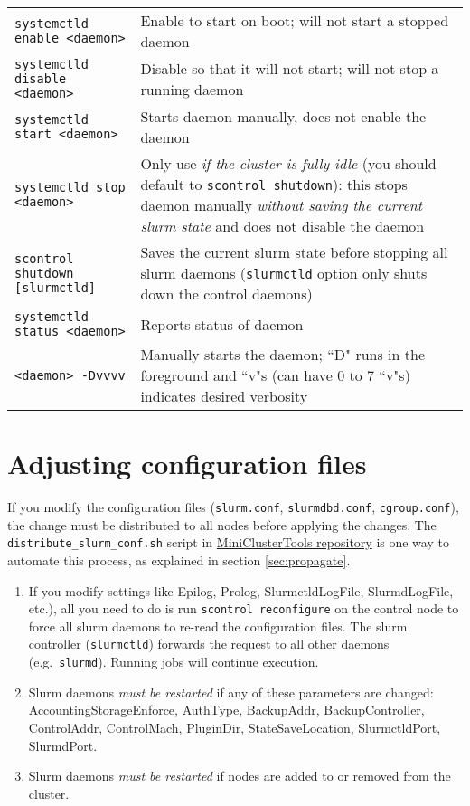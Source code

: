\begin{itemize}
\begin{tabular}{l p{3.8in}}
  \texttt{systemctld enable <daemon>}  & Enable to start on boot; will not start a stopped daemon \\
  \texttt{systemctld disable <daemon>} & Disable so that it will not start; will not stop a running daemon \\
  \texttt{systemctld start <daemon>}   & Starts daemon manually, does not enable the daemon \\
  \texttt{systemctld stop <daemon>}    & Only use \emph{if the cluster is fully idle} (you should default to \texttt{scontrol shutdown}): this stops daemon manually \emph{without saving the current slurm state} and does not disable the daemon \\
  \texttt{scontrol shutdown [slurmctld]} & Saves the current slurm state before stopping all slurm daemons (\texttt{slurmctld} option only shuts down the control daemons) \\
  \texttt{systemctld status <daemon>}  & Reports status of daemon \\
  \texttt{<daemon> -Dvvvv}             & Manually starts the daemon; ``D" runs in the foreground and ``v"s (can have 0 to 7 ``v"s) indicates desired verbosity \\
\end{tabular}

\end{itemize}

\section{Adjusting configuration files} \label{sec:slurmconfig}

If you modify the configuration files (\texttt{slurm.conf}, \texttt{slurmdbd.conf}, \texttt{cgroup.conf}), the change must be distributed to all nodes before applying the changes. The \texttt{distribute\_slurm\_conf.sh} script in \href{https://github.com/coyleej/MiniClusterTools}{MiniClusterTools repository} is one way to automate this process, as explained in section \ref{sec:propagate}.

\begin{enumerate}
  \item If you modify settings like Epilog, Prolog, SlurmctldLogFile, SlurmdLogFile, etc.), all you need to do is run \texttt{scontrol reconfigure} on the control node to force all slurm daemons to re-read the configuration files. The slurm controller (\texttt{slurmctld}) forwards the request to all other daemons (e.g.\ \texttt{slurmd}). Running jobs will continue execution. 
  \item Slurm daemons \emph{must be restarted} if any of these parameters are changed: AccountingStorageEnforce, AuthType, BackupAddr, BackupController, ControlAddr, ControlMach, PluginDir, StateSaveLocation, SlurmctldPort, SlurmdPort.
  \item Slurm daemons \emph{must be restarted} if nodes are added to or removed from the cluster.
\end{enumerate}

